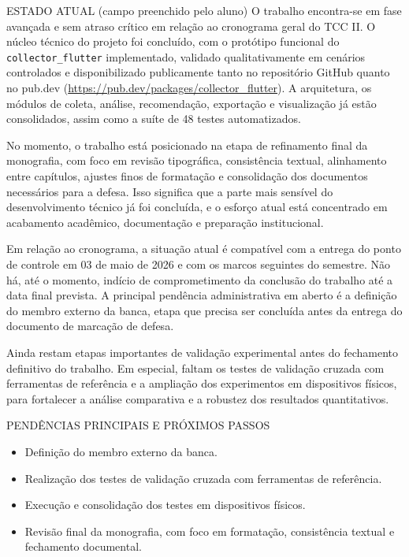 \documentclass[12pt,a4paper]{article}
\begin{document}
\begin{sectionbox}{ESTADO ATUAL (campo preenchido pelo aluno)}
\noindent
O trabalho encontra-se em fase avançada e sem atraso crítico em relação ao cronograma geral do TCC II. O núcleo técnico do projeto foi concluído, com o protótipo funcional do \texttt{collector\_flutter} implementado, validado qualitativamente em cenários controlados e disponibilizado publicamente tanto no repositório GitHub quanto no pub.dev (\url{https://pub.dev/packages/collector_flutter}). A arquitetura, os módulos de coleta, análise, recomendação, exportação e visualização já estão consolidados, assim como a suíte de 48 testes automatizados.

\vspace{0.3cm}

\noindent
No momento, o trabalho está posicionado na etapa de refinamento final da monografia, com foco em revisão tipográfica, consistência textual, alinhamento entre capítulos, ajustes finos de formatação e consolidação dos documentos necessários para a defesa. Isso significa que a parte mais sensível do desenvolvimento técnico já foi concluída, e o esforço atual está concentrado em acabamento acadêmico, documentação e preparação institucional.

\vspace{0.3cm}

\noindent
Em relação ao cronograma, a situação atual é compatível com a entrega do ponto de controle em 03 de maio de 2026 e com os marcos seguintes do semestre. Não há, até o momento, indício de comprometimento da conclusão do trabalho até a data final prevista. A principal pendência administrativa em aberto é a definição do membro externo da banca, etapa que precisa ser concluída antes da entrega do documento de marcação de defesa.

\vspace{0.3cm}

\noindent
Ainda restam etapas importantes de validação experimental antes do fechamento definitivo do trabalho. Em especial, faltam os testes de validação cruzada com ferramentas de referência e a ampliação dos experimentos em dispositivos físicos, para fortalecer a análise comparativa e a robustez dos resultados quantitativos.
\end{sectionbox}

\begin{sectionbox}{PENDÊNCIAS PRINCIPAIS E PRÓXIMOS PASSOS}
\begin{itemize}
  \item Definição do membro externo da banca.
  \item Realização dos testes de validação cruzada com ferramentas de referência.
  \item Execução e consolidação dos testes em dispositivos físicos.
  \item Revisão final da monografia, com foco em formatação, consistência textual e fechamento documental.
\end{itemize}
\end{sectionbox}
\end{document}
